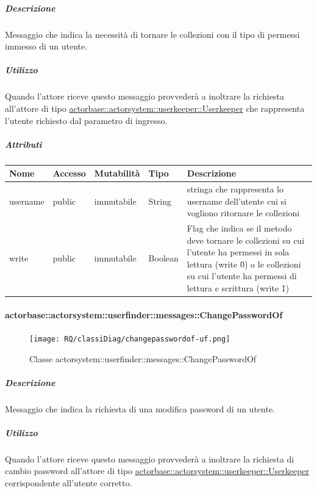 \documentclass{scalatekids-article}
\begin{document}
\subparagraph{Descrizione}
Messaggio che indica la necessità di tornare le collezioni con il tipo di permessi immesso di un utente.

\subparagraph{Utilizzo}
Quando l'attore riceve questo messaggio provvederà a inoltrare la richiesta all'attore di tipo \hyperref[sec:actorbase::actorsystem::userkeeper::Userkeeper]{actorbase::\allowbreak{}actorsystem::\allowbreak{}userkeeper::\allowbreak{}Userkeeper}
che rappresenta l'utente richiesto dal parametro di ingresso.

\subparagraph{Attributi}
\begin{tabular}{| p{3cm} | p{1.5cm} | p{2cm} | p{2cm} | p{8.5cm} |}
  \hline
  Nome & Accesso & Mutabilità & Tipo & Descrizione\\
  \hline
  username & public & immutabile & String & stringa che rappresenta lo username dell'utente cui si vogliono ritornare le collezioni \\
  \hline
  write & public & immutabile & Boolean & Flag che indica se il metodo deve tornare le collezioni su cui l'utente ha permessi in sola lettura (write \= 0) o le collezioni su cui l'utente ha permessi di lettura e scrittura (write \= 1) \\
  \hline
\end{tabular}

\paragraph{actorbase::actorsystem::userfinder::messages::ChangePasswordOf}
\label{sec:actorbase::actorsystem::userfinder::messages::ChangePasswordOf}

\begin{figure}[H]
  \begin{center}
    \texttt{[image: RQ/classiDiag/changepasswordof-uf.png]}
    \caption{Classe actorsystem::userfinder::messages::ChangePasswordOf}
  \end{center}
\end{figure}

\subparagraph{Descrizione}
Messaggio che indica la richiesta di una modifica password di un utente.

\subparagraph{Utilizzo}
Quando l'attore riceve questo messaggio provvederà a inoltrare la richiesta di cambio password all'attore di tipo \hyperref[sec:actorbase::actorsystem::userkeeper::Userkeeper]{actorbase::\allowbreak{}actorsystem::\allowbreak{}userkeeper::\allowbreak{}Userkeeper}
corrispondente all'utente corretto.
\end{document}

